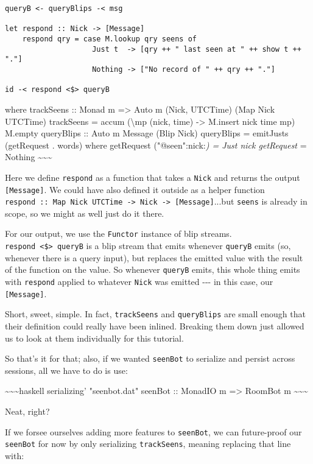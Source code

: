 \documentclass[]{article}
\begin{document}
\begin{verbatim}
queryB <- queryBlips -< msg

let respond :: Nick -> [Message]
    respond qry = case M.lookup qry seens of
                    Just t  -> [qry ++ " last seen at " ++ show t ++ "."]
                    Nothing -> ["No record of " ++ qry ++ "."]

id -< respond <$> queryB
\end{verbatim}

where trackSeens :: Monad m =\textgreater{} Auto m (Nick, UTCTime) (Map Nick
UTCTime) trackSeens = accum (\textbackslash{}mp (nick, time) -\textgreater{}
M.insert nick time mp) M.empty queryBlips :: Auto m Message (Blip Nick)
queryBlips = emitJusts (getRequest . words) where getRequest
("@seen":nick:\emph{) = Just nick getRequest } = Nothing
\textasciitilde{}\textasciitilde{}\textasciitilde{}

Here we define \texttt{respond} as a function that takes a \texttt{Nick} and
returns the output \texttt{{[}Message{]}}. We could have also defined it outside
as a helper function
\texttt{respond\ ::\ Map\ Nick\ UTCTime\ -\textgreater{}\ Nick\ -\textgreater{}\ {[}Message{]}}...but
\texttt{seens} is already in scope, so we might as well just do it there.

For our output, we use the \texttt{Functor} instance of blip streams.
\texttt{respond\ \textless{}\$\textgreater{}\ queryB} is a blip stream that
emits whenever \texttt{queryB} emits (so, whenever there is a query input), but
replaces the emitted value with the result of the function on the value. So
whenever \texttt{queryB} emits, this whole thing emits with \texttt{respond}
applied to whatever \texttt{Nick} was emitted -\/-\/- in this case, our
\texttt{{[}Message{]}}.

Short, sweet, simple. In fact, \texttt{trackSeens} and \texttt{queryBlips} are
small enough that their definition could really have been inlined. Breaking them
down just allowed us to look at them individually for this tutorial.

So that's it for that; also, if we wanted \texttt{seenBot} to serialize and
persist across sessions, all we have to do is use:

\textasciitilde{}\textasciitilde{}\textasciitilde{}haskell serializing'
"seenbot.dat" seenBot :: MonadIO m =\textgreater{} RoomBot m
\textasciitilde{}\textasciitilde{}\textasciitilde{}

Neat, right?

If we forsee ourselves adding more features to \texttt{seenBot}, we can
future-proof our \texttt{seenBot} for now by only serializing
\texttt{trackSeens}, meaning replacing that line with:
\end{document}
